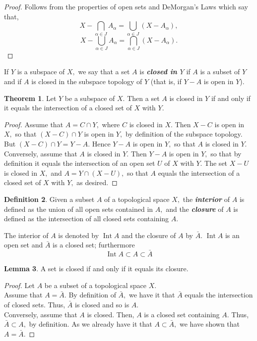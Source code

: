 \documentclass{article}
\theoremstyle{definition}
\newtheorem{theorem}{Theorem}[section]
\newtheorem{lem}[theorem]{Lemma}
\newtheorem{defn}[theorem]{Definition}
\newcommand{\Int}{\operatorname{Int}}
\begin{document}
\begin{proof}
  Follows from the properties of open sets and DeMorgan's Laws which say that,
  \[X - \bigcap_{\alpha\in J}A_\alpha = \bigcup_{\alpha\in J}(X - A_\alpha),\]
  \[X - \bigcup_{\alpha\in J}A_\alpha = \bigcap_{\alpha\in J}(X - A_\alpha).\]
\end{proof}
%
If $Y$ is a subspace of $X,$ we say that a set $A$ is \textbf{\emph{closed in $Y$}} if $A$ is a subset of $Y$ and if $A$ is closed in the subspace topology of $Y$ (that is, if $Y-A$ is open in $Y$).
\begin{theorem} 
  Let $Y$ be a subspace of $X.$ Then a set $A$ is closed in $Y$ if and only if it equals the intersection of a closed set of $X$ with $Y.$
\end{theorem}
\begin{proof}
  Assume that $A = C \cap Y,$ where $C$ is closed in $X.$ Then $X - C$ is open in $X,$ so that $(X-C)\cap Y$ is open in $Y,$ by definition of the subspace topology. But $(X-C)\cap Y = Y - A.$ Hence $Y - A$ is open in $Y,$ so that $A$ is closed in $Y.$ \\
  Conversely, assume that $A$ is closed in $Y.$ Then $Y - A$ is open in $Y,$ so that by definition it equals the intersection of an open set $U$ of $X$ with $Y.$ The set $X - U$ is closed in $X,$ and $A = Y \cap (X - U),$ so that $A$ equals the intersection of a closed set of $X$ with $Y,$ as desired.
\end{proof}
%
\begin{defn} 
  Given a subset $A$ of a topological space $X,$ the \textbf{\emph{interior}} of $A$ is defined as the union of all open sets contained in $A,$ and the \textbf{\emph{closure}} of $A$ is defined as the intersection of all closed sets containing $A$.
\end{defn}
%
The interior of $A$ is denoted by $\Int A$ and the closure of $A$ by $\bar{A}$. $\Int A$ is an open set and $\bar{A}$ is a closed set; furthermore
\[\Int A \subset A \subset \bar{A}\]
%
\begin{lem}
  A set is closed if and only if it equals its closure.
\end{lem}
\begin{proof}
  Let $A$ be a subset of a topological space $X.$\\
  Assume that $A = \bar{A}.$ By definition of $\bar{A},$ we have it that $\bar{A}$ equals the intersection of closed sets. Thus, $\bar{A}$ is closed and so is $A.$\\
  Conversely, assume that $A$ is closed. Then, $A$ is a closed set containing $A.$ Thus, $\bar{A} \subset A,$ by definition. As we already have it that $A \subset \bar{A},$ we have shown that $A = \bar{A}.$
\end{proof}
\end{document}
